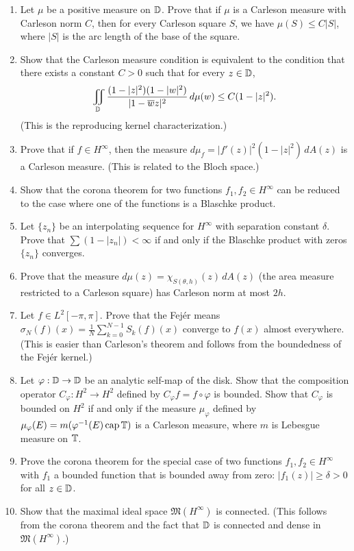 \begin{enumerate}
    \item [B] Let \(\mu\) be a positive measure on \(\mathbb{D}\). Prove that if \(\mu\) is a Carleson measure with Carleson norm \(C\), then for every Carleson square \(S\), we have \(\mu(S) \leq C |S|\), where \(|S|\) is the arc length of the base of the square.
    \item [I] Show that the Carleson measure condition is equivalent to the condition that there exists a constant \(C > 0\) such that for every \(z \in \mathbb{D}\),
    \[
    \iint_{\mathbb{D}} \frac{(1-|z|^2)(1-|w|^2)}{|1-\overline{w}z|^2}\,d\mu(w) \leq C (1-|z|^2).
    \]
    (This is the reproducing kernel characterization.)
    \item [I] Prove that if \(f \in H^\infty\), then the measure \(d\mu_f = |f'(z)|^2 (1-|z|^2)\,dA(z)\) is a Carleson measure. (This is related to the Bloch space.)
    \item [A] Show that the corona theorem for two functions \(f_1, f_2 \in H^\infty\) can be reduced to the case where one of the functions is a Blaschke product.
    \item [I] Let \(\{z_n\}\) be an interpolating sequence for \(H^\infty\) with separation constant \(\delta\). Prove that \(\sum (1-|z_n|) < \infty\) if and only if the Blaschke product with zeros \(\{z_n\}\) converges.
    \item [B] Prove that the measure \(d\mu(z) = \chi_{S(\theta, h)}(z)\,dA(z)\) (the area measure restricted to a Carleson square) has Carleson norm at most \(2h\).
    \item [B] Let \(f \in L^2[-\pi,\pi]\). Prove that the Fej\'er means \(\sigma_N(f)(x) = \frac{1}{N} \sum_{k=0}^{N-1} S_k(f)(x)\) converge to \(f(x)\) almost everywhere. (This is easier than Carleson's theorem and follows from the boundedness of the Fej\'er kernel.)
    \item [I] Let \(\varphi: \mathbb{D} \to \mathbb{D}\) be an analytic self-map of the disk. Show that the composition operator \(C_\varphi: H^2 \to H^2\) defined by \(C_\varphi f = f \circ \varphi\) is bounded. Show that \(C_\varphi\) is bounded on \(H^2\) if and only if the measure \(\mu_\varphi\) defined by \(\mu_\varphi(E) = m(\varphi^{-1}(E) \operatorname{\mathrm{cap}} \mathbb{T})\) is a Carleson measure, where \(m\) is Lebesgue measure on \(\mathbb{T}\).
    \item [I] Prove the corona theorem for the special case of two functions \(f_1, f_2 \in H^\infty\) with \(f_1\) a bounded function that is bounded away from zero: \(|f_1(z)| \geq \delta > 0\) for all \(z \in \mathbb{D}\).
    \item [I] Show that the maximal ideal space \(\mathfrak{M}(H^\infty)\) is connected. (This follows from the corona theorem and the fact that \(\mathbb{D}\) is connected and dense in \(\mathfrak{M}(H^\infty)\).)

\end{enumerate}
